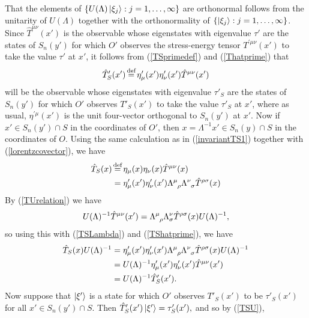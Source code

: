 That the elements of $\{U(\Lambda)\ket{\xi_j}:j=1,\ldots,\infty\}$ are orthonormal follows from the unitarity of $U(\Lambda)$ together with the orthonormality of  $\{\ket{\xi_j}:j=1,\ldots,\infty\}$.  Since $\hat{T}^{\mu\nu}(x')$ is the observable whose eigenstates with eigenvalue $\tau'$ are the states of $S_n(y')$ for which $O'$ observes the stress-energy tensor $T^{\prime\mu\nu}(x')$ to take the value $\tau'$ at $x'$, it follows from (\ref{TSprimedef}) and (\ref{Thatprime})  that 
\begin{equation}\label{TShatprime}
	\hat{T}'_S(x')\myeq\eta_\mu'(x')\eta_\nu'(x')\hat{T}^{\mu\nu}(x')
\end{equation}
 will be the observable whose eigenstates with eigenvalue $\tau'_S$ are the states of $S_n(y')$ for which $O'$ observes $T'_S(x')$ to take the value $\tau'_S$ at $x'$, where as usual, $\eta^{\prime\mu}(x')$ is the unit four-vector orthogonal to $S_n(y')$ at $x'$. Now if $x'\in S_n(y')\cap S$ in the coordinates of $O'$, then $x=\Lambda^{-1}x'\in S_n(y)\cap S$ in the coordinates of $O$. Using the same calculation as in (\ref{invariantTS1}) together with (\ref{lorentzcovector}), we have
\begin{equation}\label{TSLambda}
\begin{split}
\hat{T}_S(x)&\myeq\eta_\mu(x)\eta_\nu(x)\hat{T}^{\mu\nu}(x)\\
&=\eta_{\mu}'(x')\eta_{\nu}'(x') \Lambda\indices{^\mu_\rho}\Lambda\indices{^\nu_\sigma}\hat{T}^{\rho\sigma}(x)
\end{split}
\end{equation}
By (\ref{TUrelation}) we have
\begin{equation}
	U(\Lambda)^{-1}\hat{T}^{\mu\nu}(x')=\Lambda\indices{^\mu_\rho}\Lambda{^\nu_\sigma}\hat{T}^{\rho\sigma}(x)U(\Lambda)^{-1},
\end{equation}
so using this with (\ref{TSLambda}) and (\ref{TShatprime}), we have
\begin{equation}\label{TSU}
\begin{split}
\hat{T}_S(x)U(\Lambda)^{-1}&=\eta_{\mu}'(x')\eta_{\nu}'(x')\Lambda\indices{^\mu_\rho}\Lambda\indices{^\nu_\sigma}\hat{T}^{\rho\sigma}(x)U(\Lambda)^{-1}\\
&=U(\Lambda)^{-1} \eta_{\mu}'(x')\eta_{\nu}'(x')\hat{T}^{\mu\nu}(x')\\
&=U(\Lambda)^{-1} \hat{T}_S'(x').
\end{split}
\end{equation}
Now suppose that $\ket{\xi'}$ is a state for which $O'$ observes $T'_S(x')$ to be $\tau'_S(x')$ for all $x'\in S_n(y')\cap S$. Then $\hat{T}_S'(x')\ket{\xi'}=\tau_S'(x'),$ and so by (\ref{TSU}), 
